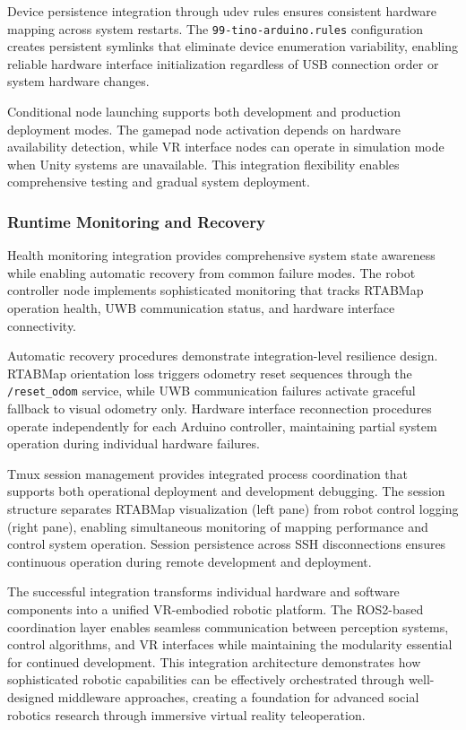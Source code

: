 Device persistence integration through udev rules ensures consistent hardware mapping across system restarts. The \texttt{99-tino-arduino.rules} configuration creates persistent symlinks that eliminate device enumeration variability, enabling reliable hardware interface initialization regardless of USB connection order or system hardware changes.

Conditional node launching supports both development and production deployment modes. The gamepad node activation depends on hardware availability detection, while VR interface nodes can operate in simulation mode when Unity systems are unavailable. This integration flexibility enables comprehensive testing and gradual system deployment.

\subsubsection{Runtime Monitoring and Recovery}

Health monitoring integration provides comprehensive system state awareness while enabling automatic recovery from common failure modes. The robot controller node implements sophisticated monitoring that tracks RTABMap operation health, UWB communication status, and hardware interface connectivity.

Automatic recovery procedures demonstrate integration-level resilience design. RTABMap orientation loss triggers odometry reset sequences through the \texttt{/reset\_odom} service, while UWB communication failures activate graceful fallback to visual odometry only. Hardware interface reconnection procedures operate independently for each Arduino controller, maintaining partial system operation during individual hardware failures.

Tmux session management provides integrated process coordination that supports both operational deployment and development debugging. The session structure separates RTABMap visualization (left pane) from robot control logging (right pane), enabling simultaneous monitoring of mapping performance and control system operation. Session persistence across SSH disconnections ensures continuous operation during remote development and deployment.

The successful integration transforms individual hardware and software components into a unified VR-embodied robotic platform. The ROS2-based coordination layer enables seamless communication between perception systems, control algorithms, and VR interfaces while maintaining the modularity essential for continued development. This integration architecture demonstrates how sophisticated robotic capabilities can be effectively orchestrated through well-designed middleware approaches, creating a foundation for advanced social robotics research through immersive virtual reality teleoperation.
